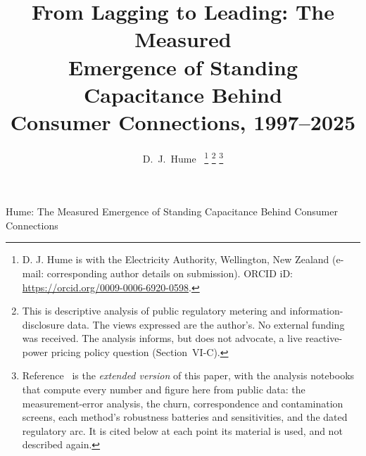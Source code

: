 \documentclass[journal]{IEEEtran}
\begin{document}
\title{From Lagging to Leading: The Measured\\
Emergence of Standing Capacitance Behind\\ Consumer Connections, 1997--2025}

\author{D.~J.~Hume~%
\thanks{D. J. Hume is with the Electricity Authority, Wellington, New Zealand
(e-mail: corresponding author details on submission).
ORCID iD: \url{https://orcid.org/0009-0006-6920-0598}.}%
\thanks{This is descriptive analysis of public regulatory metering and
information-disclosure data. The views expressed are the author's. No external
funding was received. The analysis informs, but does not advocate, a live
reactive-power pricing policy question (Section~VI-C).}%
\thanks{Reference~\cite{hume_extended} is the \emph{extended version} of this
paper, with the analysis notebooks that compute every number and figure here from
public data: the measurement-error analysis, the churn, correspondence and
contamination screens, each method's robustness batteries and sensitivities, and
the dated regulatory arc. It is cited below at each point its material is used,
and not described again.}}

%
{Hume: The Measured Emergence of Standing Capacitance Behind Consumer Connections}

\maketitle
\end{document}
